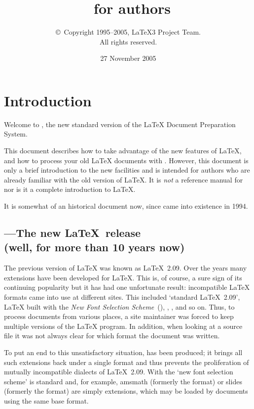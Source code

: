 \documentclass{ltxguide}[2001/05/28]
\title{\LaTeXe~for authors}
\author{\copyright~Copyright 1995--2005, \LaTeX3 Project Team.\\
   All rights reserved.}
\date{27 November 2005}
\begin{document}
\maketitle

\tableofcontents

\section{Introduction}

Welcome to \LaTeXe, the new standard version of the \LaTeX{} Document
Preparation System.

This document describes how to take advantage of the new features of
\LaTeX, and how to process your old \LaTeX{} documents with
\LaTeXe. However, this document is only a brief introduction to the
new facilities and is intended for authors who are already familiar
with the old version of \LaTeX{}.  It is \emph{not} a reference manual
for \LaTeXe{} nor is it a complete introduction to \LaTeX.

It is somewhat of an historical document now, since \LaTeXe{} came into
existence in 1994.

\subsection[\LaTeXe---The new \LaTeX~release]
  {\LaTeXe---The new \LaTeX~release\\ (well, for more than 10 years now)}

The previous version of \LaTeX{} was known as \LaTeX~2.09.  Over the
years many extensions have been developed for \LaTeX.  This is, of
course, a sure sign of its continuing popularity but it has had one
unfortunate result: incompatible \LaTeX{} formats came into use at
different sites.  This included `standard \LaTeX~2.09', \LaTeX{} built
with the \emph{New Font Selection Scheme}~(\NFSS), \SLiTeX, \AmSLaTeX,
and so on.  Thus, to process documents from various places, a site
maintainer was forced to keep multiple versions of the \LaTeX{}
program.  In addition, when looking at a source file it was not always
clear for which format the document was written.

To put an end to this unsatisfactory situation, \LaTeXe{} has been
produced; it brings all such extensions back under a single format and
thus prevents the proliferation of mutually incompatible dialects of
\LaTeX~2.09.  With \LaTeXe{} the `new font selection scheme' is
standard and, for example, \textsf{amsmath} (formerly the \AmSLaTeX{}
format) or \textsf{slides} (formerly the \SLiTeX{} format) are simply
extensions, which may be loaded by documents using the same base format.
\end{document}
